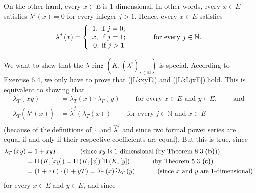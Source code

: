 \documentclass[numbers=enddot,12pt,final,onecolumn,notitlepage]{scrartcl}%
\begin{document}
On the other hand, every $x\in E$ is $1$-dimensional. In other words, every
$x\in E$ satisfies $\lambda^{j}\left(  x\right)  =0$ for every integer $j>1$.
Hence, every $x\in E$ satisfies%
\begin{equation}
\lambda^{j}\left(  x\right)  =\left\{
\begin{array}
[c]{c}%
1,\text{ if }j=0;\\
x,\text{ if }j=1;\\
0,\text{ if }j>1
\end{array}
\right.  \ \ \ \ \ \ \ \ \ \ \text{for every }j\in\mathbb{N}.
\label{sol.8.3.2}%
\end{equation}


We want to show that the $\lambda$-ring $\left(  K,\left(  \lambda^{i}\right)
_{i\in\mathbb{N}}\right)  $ is special. According to Exercise 6.4, we only
have to prove that (\ref{LkxyE}) and (\ref{LkLjxE}) hold. This is equivalent
to showing that%
\begin{align*}
\lambda_{T}\left(  xy\right)   &  =\lambda_{T}\left(  x\right)  \widehat{\cdot
}\lambda_{T}\left(  y\right)  \ \ \ \ \ \ \ \ \ \ \text{for every }x\in
E\text{ and }y\in E,\ \ \ \ \ \ \ \ \ \ \text{and}\\
\lambda_{T}\left(  \lambda^{j}\left(  x\right)  \right)   &  =\widehat{\lambda
}^{j}\left(  \lambda_{T}\left(  x\right)  \right)
\ \ \ \ \ \ \ \ \ \ \text{for every }j\in\mathbb{N}\text{ and }x\in E
\end{align*}
(because of the definitions of $\widehat{\cdot}$ and $\widehat{\lambda}^{j}$
and since two formal power series are equal if and only if their respective
coefficients are equal). But this is true, since%
\begin{align*}
\lambda_{T}\left(  xy\right)   &  =1+xyT\ \ \ \ \ \ \ \ \ \ \left(
\text{since }xy\text{ is }1\text{-dimensional (by Theorem 8.3 \textbf{(b)}%
)}\right) \\
&  =\Pi\left(  K,\left[  xy\right]  \right)  =\Pi\left(  K,\left[  x\right]
\right)  \widehat{\cdot}\Pi\left(  K,\left[  y\right]  \right)
\ \ \ \ \ \ \ \ \ \ \left(  \text{by Theorem 5.3 \textbf{(c)}}\right) \\
&  =\left(  1+xT\right)  \cdot\left(  1+yT\right)  =\lambda_{T}\left(
x\right)  \widehat{\cdot}\lambda_{T}\left(  y\right)
\ \ \ \ \ \ \ \ \ \ \left(  \text{since }x\text{ and }y\text{ are
}1\text{-dimensional}\right)
\end{align*}
for every $x\in E$ and $y\in E$, and since%
\end{document}
